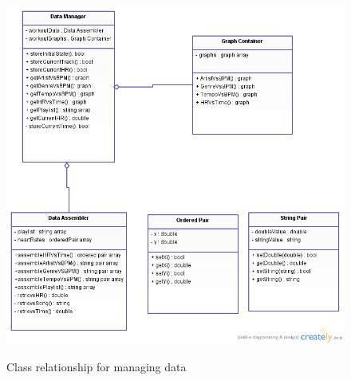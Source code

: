 \documentclass[letterpaper,english, 12pt]{scrreprt}
\begin{document}
\begin{figure}[H]
	\centering
	\includegraphics[scale=.55]{img/Class_Diagrams/dataManagement.png}\\
	\caption {Class relationship for managing data}
\end{figure}
\end{document}
